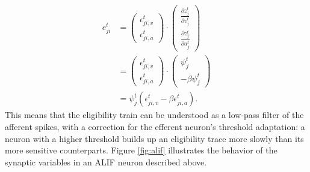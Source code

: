             \begin{align}
            e^t_{ji} &= \begin{pmatrix}
            \epsilon_{ji, v}^t\\
            \epsilon_{ji, a}^t
            \end{pmatrix}
            \cdot
            \begin{pmatrix}
            \frac{\partial z^t_j}{\partial v^t_j}\\
            \frac{\partial z^t_j}{\partial a^t_j}
            \end{pmatrix}\\
            &= \begin{pmatrix}
            \epsilon_{ji, v}^t\\
            \epsilon_{ji, a}^t
            \end{pmatrix}
            \cdot
            \begin{pmatrix}
            \psi^t_j\\
            -\beta\psi^t_j
            \end{pmatrix}\\
            &= \psi^t_j\left(\epsilon_{ji, v}^t - \beta\epsilon_{ji, a}^t\right).
            \end{align}
            This means that the eligibility train can be understood as a low-pass filter of the afferent spikes, with a correction for the efferent neuron's threshold adaptation: a neuron with a higher threshold builds up an eligibility trace more slowly than its more sensitive counterparts.
            Figure \ref{fig:alif} illustrates the behavior of the synaptic variables in an ALIF neuron described above.

